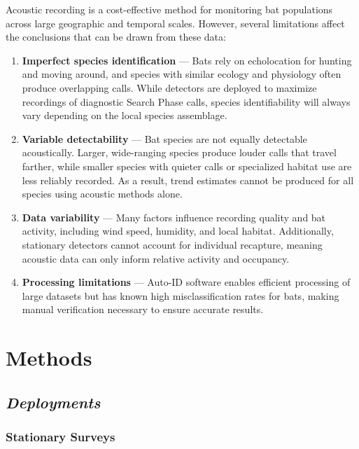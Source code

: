 \documentclass[
  letterpaper,
  DIV=11,
  numbers=noendperiod]{scrartcl}
\begin{document}
Acoustic recording is a cost-effective method for monitoring bat
populations across large geographic and temporal scales. However,
several limitations affect the conclusions that can be drawn from these
data:

\begin{enumerate}
\def\labelenumi{\arabic{enumi}.}
\item
  \textbf{Imperfect species identification} --- Bats rely on
  echolocation for hunting and moving around, and species with similar
  ecology and physiology often produce overlapping calls. While
  detectors are deployed to maximize recordings of diagnostic Search
  Phase calls, species identifiability will always vary depending on the
  local species assemblage.
\item
  \textbf{Variable detectability} --- Bat species are not equally
  detectable acoustically. Larger, wide-ranging species produce louder
  calls that travel farther, while smaller species with quieter calls or
  specialized habitat use are less reliably recorded. As a result, trend
  estimates cannot be produced for all species using acoustic methods
  alone.
\item
  \textbf{Data variability} --- Many factors influence recording quality
  and bat activity, including wind speed, humidity, and local habitat.
  Additionally, stationary detectors cannot account for individual
  recapture, meaning acoustic data can only inform relative activity and
  occupancy.
\item
  \textbf{Processing limitations} --- Auto-ID software enables efficient
  processing of large datasets but has known high misclassification
  rates for bats, making manual verification necessary to ensure
  accurate results.
\end{enumerate}

\section{Methods}\label{methods}

\subsection{\texorpdfstring{\emph{Deployments}}{Deployments}}\label{deployments}

\subsubsection{Stationary Surveys}\label{stationary-surveys}
\end{document}
